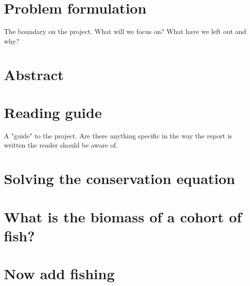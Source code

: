 \documentclass{article}
\begin{document}
\section*{Problem formulation}
The boundary on the project. What will we focus on? What have we left out and why?
\newpage
\section*{Abstract}
\newpage
\section*{Reading guide}
A "guide" to the project. Are there anything specific in the way the report is written the reader should be aware of.
\newpage


\cleardoublepage
%

\tableofcontents 
\thispagestyle{empty} %
\cleardoublepage
\setcounter{page}{1}
%


\section{Solving the conservation equation}\label{sec:Ex1}
\subsection{}\label{sec:Ex1A}



\section{What is the biomass of a cohort of fish?}\label{sec:Ex2}
\subsection{}\label{sec:Ex2A}



\section{Now add fishing}\label{sec:Ex3}
\end{document}
